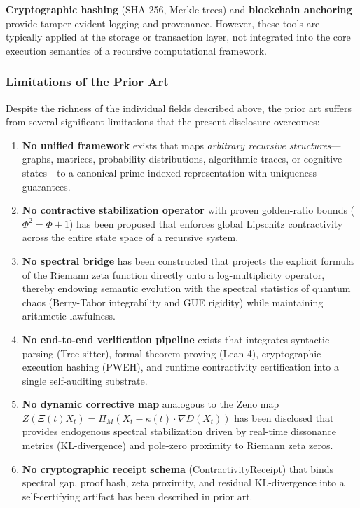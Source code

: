 \documentclass[12pt]{article}
\theoremstyle{plain}
\theoremstyle{definition}
\theoremstyle{remark}
\begin{document}
\textbf{Cryptographic hashing} (SHA-256, Merkle trees) and \textbf{blockchain anchoring} provide tamper-evident logging and provenance. However, these tools are typically applied at the storage or transaction layer, not integrated into the core execution semantics of a recursive computational framework.

\subsubsection{Limitations of the Prior Art}

Despite the richness of the individual fields described above, the prior art suffers from several significant limitations that the present disclosure overcomes:

\begin{enumerate}
    \item \textbf{No unified framework} exists that maps \emph{arbitrary recursive structures}—graphs, matrices, probability distributions, algorithmic traces, or cognitive states—to a canonical prime-indexed representation with uniqueness guarantees.
    
    \item \textbf{No contractive stabilization operator} with proven golden-ratio bounds ($\Phi^2 = \Phi + 1$) has been proposed that enforces global Lipschitz contractivity across the entire state space of a recursive system.
    
    \item \textbf{No spectral bridge} has been constructed that projects the explicit formula of the Riemann zeta function directly onto a log-multiplicity operator, thereby endowing semantic evolution with the spectral statistics of quantum chaos (Berry-Tabor integrability and GUE rigidity) while maintaining arithmetic lawfulness.
    
    \item \textbf{No end-to-end verification pipeline} exists that integrates syntactic parsing (Tree-sitter), formal theorem proving (Lean 4), cryptographic execution hashing (PWEH), and runtime contractivity certification into a single self-auditing substrate.
    
    \item \textbf{No dynamic corrective map} analogous to the Zeno map $Z(\Xi(t)X_t) = \Pi_M(X_t - \kappa(t)\cdot \nabla D(X_t))$ has been disclosed that provides endogenous spectral stabilization driven by real-time dissonance metrics (KL-divergence) and pole-zero proximity to Riemann zeta zeros.
    
    \item \textbf{No cryptographic receipt schema} (ContractivityReceipt) that binds spectral gap, proof hash, zeta proximity, and residual KL-divergence into a self-certifying artifact has been described in prior art.
\end{enumerate}
\end{document}
